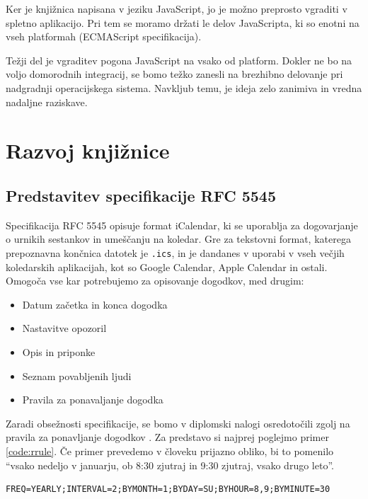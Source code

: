 Ker je knjižnica napisana v jeziku JavaScript, jo je možno preprosto vgraditi v spletno aplikacijo. Pri tem se moramo držati le delov JavaScripta, ki so enotni na vseh platformah (ECMAScript specifikacija).

Težji del je vgraditev pogona JavaScript na vsako od platform. Dokler ne bo na voljo domorodnih integracij, se bomo težko zanesli na brezhibno delovanje pri nadgradnji operacijskega sistema. Navkljub temu, je ideja zelo zanimiva in vredna nadaljne raziskave.

\chapter{Razvoj knjižnice}
\label{chap:development}

\section{Predstavitev specifikacije RFC 5545}

Specifikacija RFC 5545\cite{rfc5545} opisuje format iCalendar, ki se uporablja za dogovarjanje o urnikih sestankov in umeščanju na koledar. Gre za tekstovni format, katerega prepoznavna končnica datotek je \texttt{.ics}, in je dandanes v uporabi v vseh večjih koledarskih aplikacijah, kot so Google Calendar, Apple Calendar in ostali. Omogoča vse kar potrebujemo za opisovanje dogodkov, med drugim:

\begin{itemize}
  \item Datum začetka in konca dogodka
  \item Nastavitve opozoril
  \item Opis in priponke
  \item Seznam povabljenih ljudi
  \item Pravila za ponavaljanje dogodka
\end{itemize}

Zaradi obsežnosti specifikacije, se bomo v diplomski nalogi osredotočili zgolj na pravila za ponavljanje dogodkov \cite{rrule}. Za predstavo si najprej poglejmo primer \ref{code:rrule}. Če primer prevedemo v človeku prijazno obliko, bi to pomenilo ``vsako nedeljo v januarju, ob 8:30 zjutraj in 9:30 zjutraj, vsako drugo leto''.

\begin{lstlisting}[caption=Primer uporabe pravila RRULE spefikiacije RFC 5545., label=code:rrule]
FREQ=YEARLY;INTERVAL=2;BYMONTH=1;BYDAY=SU;BYHOUR=8,9;BYMINUTE=30
\end{lstlisting}

